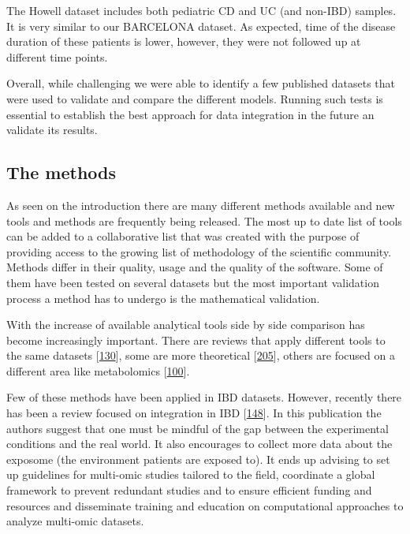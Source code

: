 \documentclass[
  12pt,
  a4paper,
  twoside,
  openright]{book}
\begin{document}
The Howell dataset includes both pediatric CD and UC (and non-IBD) samples.
It is very similar to our BARCELONA dataset.
As expected, time of the disease duration of these patients is lower, however, they were not followed up at different time points.

Overall, while challenging we were able to identify a few published datasets that were used to validate and compare the different models.
Running such tests is essential to establish the best approach for data integration in the future an validate its results.

\hypertarget{the-methods}{%
\subsection{The methods}\label{the-methods}}

As seen on the introduction there are many different methods available and new tools and methods are frequently being released.
The most up to date list of tools can be added to a collaborative list that was created with the purpose of providing access to the growing list of methodology of the scientific community.
Methods differ in their quality, usage and the quality of the software.
Some of them have been tested on several datasets but the most important validation process a method has to undergo is the mathematical validation.

With the increase of available analytical tools side by side comparison has become increasingly important.
There are reviews that apply different tools to the same datasets {[}\protect\hyperlink{ref-cantini2021}{130}{]}, some are more theoretical {[}\protect\hyperlink{ref-bersanelli2016}{205}{]}, others are focused on a different area like metabolomics {[}\protect\hyperlink{ref-cavill2016}{100}{]}.

Few of these methods have been applied in IBD datasets.
However, recently there has been a review focused on integration in IBD {[}\protect\hyperlink{ref-sudhakar2022}{148}{]}.
In this publication the authors suggest that one must be mindful of the gap between the experimental conditions and the real world.
It also encourages to collect more data about the exposome (the environment patients are exposed to).
It ends up advising to set up guidelines for multi-omic studies tailored to the field, coordinate a global framework to prevent redundant studies and to ensure efficient funding and resources and disseminate training and education on computational approaches to analyze multi-omic datasets.
\end{document}
